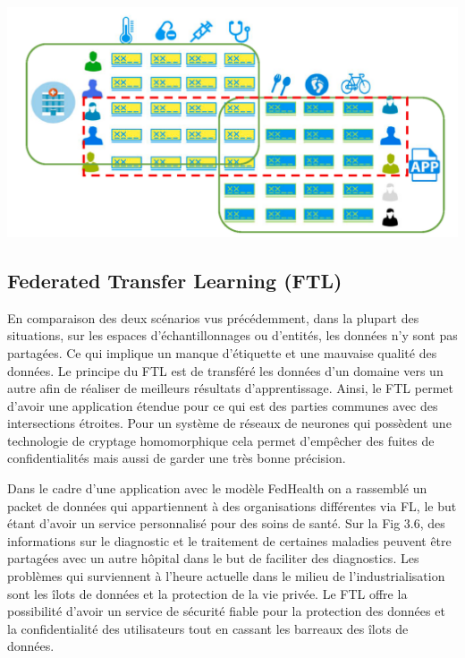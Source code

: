\documentclass[12pt,a4paper,french]{report}
\begin{document}
\begin{center}
	\includegraphics[scale=0.2]{fl_vertical}
	\label{fig1}
\end{center}


\subsection{Federated Transfer Learning (FTL)}

En comparaison des deux scénarios vus précédemment, dans la plupart des situations, sur les espaces d'échantillonnages ou d'entités, les données n'y sont pas partagées. Ce qui implique un manque d'étiquette et une mauvaise qualité des données. Le principe du FTL est de transféré les données d'un domaine vers un autre afin de réaliser de meilleurs résultats d'apprentissage. Ainsi, le FTL permet d'avoir une application étendue pour ce qui est des parties communes avec des intersections étroites. Pour un système de réseaux de neurones qui possèdent une technologie de cryptage homomorphique cela permet d'empêcher des fuites de confidentialités mais aussi de garder une très bonne précision. 

Dans le cadre d'une application avec le modèle FedHealth on a rassemblé un packet de données qui appartiennent à des organisations différentes via FL, le but étant d'avoir un service personnalisé pour des soins de santé. Sur la Fig 3.6, des informations sur le diagnostic et le traitement de certaines maladies peuvent être partagées avec un autre hôpital dans le but de faciliter des diagnostics. Les problèmes qui surviennent à l'heure actuelle dans le milieu de l'industrialisation sont les îlots de données et la protection de la vie privée. Le FTL offre la possibilité d'avoir un service de sécurité fiable pour la protection des données et la confidentialité des utilisateurs tout en cassant les barreaux des îlots de données.
\end{document}
